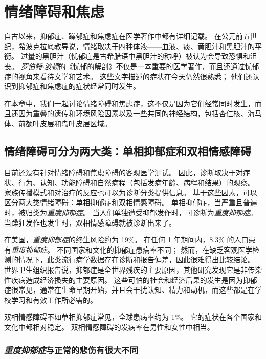 \chapter{情绪障碍和焦虑} \label{chap:chap61}

自古以来，抑郁症、躁郁症和焦虑症在医学著作中都有详细记载。
在公元前五世纪，希波克拉底教导说，情绪取决于四种体液——血液、痰、黄胆汁和黑胆汁的平衡。
过量的黑胆汁（忧郁症是古希腊语中黑胆汁的称呼）被认为会导致恐惧和沮丧。
\textit{罗伯特$\cdot$波顿}的《忧郁的解剖》不仅是一本重要的医学著作，而且还通过忧郁症的视角来看待文学和艺术。
这些文字描述的症状在今天仍然很熟悉；
他们还认识到抑郁症和焦虑症的症状经常同时发生。


在本章中，我们一起讨论情绪障碍和焦虑症，这不仅是因为它们经常同时发生，而且还因为重叠的遗传和环境风险因素以及一些共同的神经结构，包括杏仁核、海马体、前额叶皮层和岛叶皮层区域。



\section{情绪障碍可分为两大类：单相抑郁症和双相情感障碍}

目前还没有针对情绪障碍和焦虑障碍的客观医学测试。
因此，诊断取决于对症状、行为、认知、功能障碍和自然病程（包括发病年龄、病程和结果）的观察。
家族传播模式和对治疗的反应也可以为诊断分类提供信息。
基于这些因素，可以区分两大类情绪障碍：单相抑郁症和双相情感障碍。
单相抑郁症，当严重且普遍时，被归类为\textit{重度抑郁症}。
当人们单独遭受抑郁发作时，可诊断为\textit{重度抑郁症}。
当躁狂发作也发生时，双相情感障碍就被诊断出来了。


在美国，\textit{重度抑郁症}的终生风险约为 19\%。
在任何 1 年期间内，8.3\% 的人口患有\textit{重度抑郁症}。
不同国家和文化的抑郁症患病率不同；
然而，在缺乏客观医学检测的情况下，此类流行病学数据存在诊断和报告偏差，因此很难得出比较结论。
世界卫生组织报告说，抑郁症是全世界残疾的主要原因，其他研究发现它是非传染性疾病造成经济损失的主要原因。
这些可怕的社会和经济后果的发生是因为抑郁症很常见，通常在生命早期开始，并且会干扰认知、精力和动机，而这些都是在学校学习和有效工作所必需的。


双相情感障碍不如单相抑郁症常见，全球患病率约为 1\%。
它的症状在各个国家和文化中都相对稳定。
双相情感障碍的发病率在男性和女性中相当。



\subsection{\textit{重度抑郁症}与正常的悲伤有很大不同}

